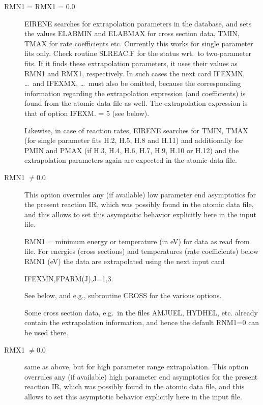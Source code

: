\begin{description}
  \item[RMN1 = RMX1 = 0.0] EIRENE searches for extrapolation parameters in the
        database, and sets the values ELABMIN and ELABMAX for cross section data, TMIN,
        TMAX for rate coefficients etc. Currently this works for single parameter fits
        only.
        Check routine SLREAC.F for the status wrt.\ to two-parameter fits.
        If it finds these extrapolation parameters, it uses their values as RMN1 and
        RMX1, respectively.
        In such cases the next card IFEXMN, \dots\ and IFEXMX, \dots\ must also be
        omitted, because the corresponding information regarding the extrapolation
        expression (and coefficients)  is found from the atomic data file as well.
        The extrapolation expression is that of option IFEXM.
        = 5 (see below).

        Likewise, in case of reaction rates, EIRENE searches for TMIN, TMAX (for single
        parameter fits H.2, H.5, H.8 and H.11) and additionally for PMIN and PMAX (if
        H.3, H.4, H.6, H.7, H.9, H.10 or H.12) and the extrapolation parameters again
        are expected in the atomic data file.

  \item[RMN1 $\neq 0.0$] This option overrules any (if available) low parameter
        end asymptotics for the present reaction IR, which was possibly found in the
        atomic data file, and this allows to set this asymptotic behavior explicitly
        here in the input file.

        RMN1 = minimum energy or temperature  (in \si{\electronvolt}) for data as read
        from file.
        For energies (cross sections) and temperatures (rate coefficients) below RMN1
        (\si{\electronvolt}) the data are extrapolated using the next input card

        IFEXMN,FPARM(J),J=1,3.

        See below, and e.g., subroutine CROSS for the various options.

        Some cross section data, e.g.\ in the files AMJUEL, HYDHEL, etc. already
        contain the extrapolation information, and hence the default RNM1=0 can be used
        there.

  \item[RMX1 $\neq 0.0$] same as above, but for high parameter range
        extrapolation.
        This option overrules any (if available) high parameter end asymptotics for the
        present reaction IR, which was possibly found in the atomic data file, and this
        allows to set this asymptotic behavior explicitly here in the input file.


\end{description}
